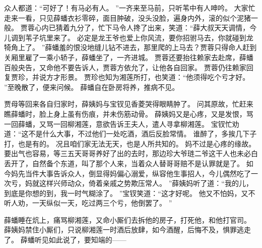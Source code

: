 众人都道：“可好了！有马必有人。
”一齐来至马前，只听苇中有人呻吟。
大家忙走来一看，只见薛蟠衣衫零碎，面目肿破，没头没脸，遍身内外，滚的似个泥猪一般。
贾蓉心内已猜着九分了，忙下马令人搀了出来，笑道：“薛大叔天天调情，今儿调到苇子坑里来了。
必定是龙王爷也爱上你风流，要你招驸马去，你就碰到龙犄角上了。
”薛蟠羞的恨没地缝儿钻不进去，那里爬的上马去？贾蓉只得命人赶到关厢里雇了一乘小轿子，薛蟠坐了，一齐进城。
贾蓉还要抬往赖家去赴席，薛蟠百般央告，又命他不要告诉人，贾蓉方依允了，让他各自回家。
贾蓉仍往赖家回复贾珍，并说方才形景。
贾珍也知为湘莲所打，也笑道：“他须得吃个亏才好。
”至晚散了，便来问候。
薛蟠自在卧房将养，推病不见。
\par
贾母等回来各自归家时，薛姨妈与宝钗见香菱哭得眼睛肿了。
问其原故，忙赶来瞧薛蟠时，脸上身上虽有伤痕，并未伤筋动骨。
薛姨妈又是心疼，又是发恨，骂一回薛蟠，又骂一回柳湘莲，意欲告诉王夫人，遣人寻拿柳湘莲。
宝钗忙劝道：“这不是什么大事，不过他们一处吃酒，酒后反脸常情。
谁醉了，多挨几下子打，也是有的。
况且咱们家无法无天，也是人所共知的。
妈不过是心疼的缘故。
要出气也容易，等三五天哥哥养好了出的去时，那边珍大爷琏二爷这干人也未必白丢开了，自然备个东道，叫了那个人来，当着众人替哥哥赔不是认罪就是了。
如今妈先当件大事告诉众人，倒显得妈偏心溺爱，纵容他生事招人，今儿偶然吃了一次亏，妈就这样兴师动众，倚着亲戚之势欺压常人。
”薛姨妈听了道：“我的儿，到底是你想的到，我一时气糊涂了。
”宝钗笑道：“这才好呢。
他又不怕妈，又不听人劝，一天纵似一天，吃过两三个亏，他倒罢了。
”\par
薛蟠睡在炕上，痛骂柳湘莲，又命小厮们去拆他的房子，打死他，和他打官司。
薛姨妈禁住小厮们，只说柳湘莲一时酒后放肆，如今酒醒，后悔不及，惧罪逃走了。
薛蟠听见如此说了，要知端的——\par
{}
